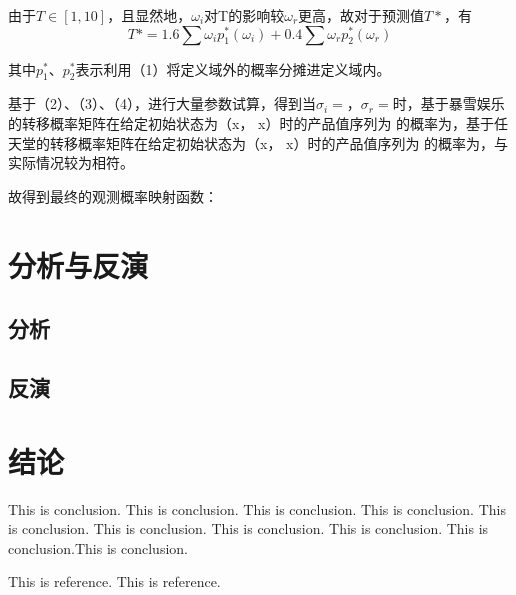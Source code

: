 \documentclass[hyperref]{ctexart}
\begin{document}
\begin{multicols}{2}
    由于$T \in [1,10]$，且显然地，$\omega_i$对T的影响较$\omega_r$更高，故对于预测值$T*$，有
    \begin{equation}
        T* = 1.6\sum{\omega_i p^*_1(\omega_i)} + 0.4\sum {\omega_r p^*_2(\omega_r)}
    \end{equation}\par
    其中$p^*_1$、$p^*_2$表示利用（1）将定义域外的概率分摊进定义域内。\par
    基于（2）、（3）、（4），进行大量参数试算，得到当$\sigma_i = $，$\sigma_r = $时，基于暴雪娱乐的转移概率矩阵在给定初始状态为（x， x）时的产品值序列为 的概率为，基于任天堂的转移概率矩阵在给定初始状态为（x， x）时的产品值序列为 的概率为，与实际情况较为相符。\par
    故得到最终的观测概率映射函数：
	    
	\section{分析与反演}
	\subsection{分析}
	\subsection{反演}
	\section{结论}
	This is conclusion. This is conclusion. This is conclusion. This is conclusion. This is conclusion. This is conclusion. This is conclusion. This is conclusion. This is conclusion.This is conclusion.
	
	\begin{thebibliography}{100}%
		This is reference.%
		This is reference.%
	\end{thebibliography}
	\end{multicols}
	
\end{document}
